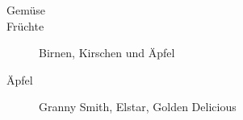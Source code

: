 \documentclass[varwidth]{standalone}
\begin{document}
\begin{description}
	\item[Gemüse]
	\item[Früchte] {Birnen, Kirschen und Äpfel}
	\item[Äpfel] Granny Smith, Elstar, Golden Delicious
\end{description}
\end{document}
